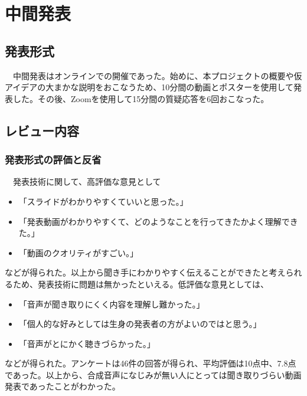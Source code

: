 \chapter{中間発表}

\section{発表形式}
　中間発表はオンラインでの開催であった。始めに、本プロジェクトの概要や仮アイデアの大まかな説明をおこなうため、10分間の動画とポスターを使用して発表した。その後、Zoomを使用して15分間の質疑応答を6回おこなった。

\section{レビュー内容}
\subsection{発表形式の評価と反省}
　発表技術に関して、高評価な意見として
\begin{itemize}
    \item 「スライドがわかりやすくていいと思った。」
    \item 「発表動画がわかりやすくて、どのようなことを行ってきたかよく理解できた。」
    \item 「動画のクオリティがすごい。」
\end{itemize}
などが得られた。以上から聞き手にわかりやすく伝えることができたと考えられるため、発表技術に問題は無かったといえる。低評価な意見としては、
\begin{itemize}
    \item 「音声が聞き取りにくく内容を理解し難かった。」
    \item 「個人的な好みとしては生身の発表者の方がよいのではと思う。」
    \item 「音声がとにかく聴きづらかった。」
\end{itemize}
などが得られた。アンケートは46件の回答が得られ、平均評価は10点中、7.8点であった。以上から、合成音声になじみが無い人にとっては聞き取りづらい動画発表であったことがわかった。


